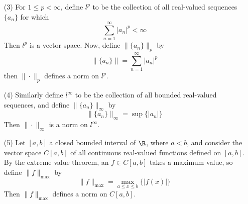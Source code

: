 \begin{example}
\begin{enumerate}
    \item[(3)] For $1 \leq p < \infty$, define $l^p$ to be the collection of all
      real-valued sequences $\{a_n\}$ for which
      \begin{equation*}
        \sum_{n=1}^\infty{|a_n|^p}<\infty
      \end{equation*}
      Then $l^p$ is a vector space. Now, define $\|\{a_n\}\|_p$ by
      \begin{equation*}
        \|\{a_n\}\|=\sum_{n=1}^\infty{|a_n|^p}
      \end{equation*}
      then $\| \cdot \|_p$ defines a norm on $l^p$.

    \item[(4)] Similarly define $l^\infty$ to be the collection of all bounded
      real-valued sequences, and define  $\|\{a_n\}\|_\infty$ by
      \begin{equation*}
        \|\{a_n\}\|_\infty=\sup\{|a_n|\}
      \end{equation*}
      Then $\| \cdot \|_\infty$ is a norm on  $l^\infty$.

    \item[(5)] Let $[a,b]$ a closed bounded interval of $\R$, where $a<b$, and
      consider the vector space  $C[a,b]$ of all continuous real-valued
      functions defined on $[a,b]$. By the extreme value theorem, an $f \in
      C[a,b]$ takes a maximum value, so define $\|f\|_\max$ by
      \begin{equation*}
        \|f\|_{\max}=\max_{a \leq x \leq b}{\{|f(x)|\}}
      \end{equation*}
      Then $\|f\|_\max$ defines a norm on $C[a,b]$.
  \end{enumerate}
\end{example}
